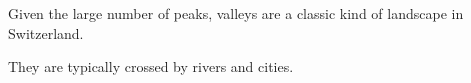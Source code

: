Given the large number of peaks, valleys are a classic kind of landscape in Switzerland.

They are typically crossed by rivers and cities.
